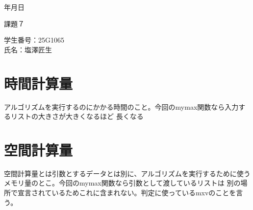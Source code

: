 \documentclass[uplatex]{jsarticle}
\begin{document}
\begin{flushright}
    \number\year 年\number\month 月\number\day 日
\end{flushright}

\begin{center}
    {\LARGE 課題７}
\end{center}

\begin{flushright}
    学生番号：25G1065\\
    氏名：塩澤匠生
\end{flushright}


\section{時間計算量}
アルゴリズムを実行するのにかかる時間のこと。今回のmymax関数なら入力するリストの大きさが大きくなるほど
長くなる
\section{空間計算量}
空間計算量とは引数とするデータとは別に、アルゴリズムを実行するために使うメモリ量のとこ。今回のmymax関数なら引数として渡しているリストは
別の場所で宣言されているためこれに含まれない。判定に使っているmxvのことを言う。
\end{document}

